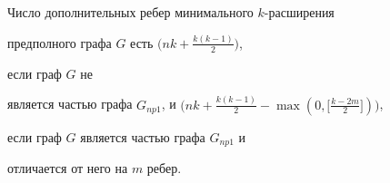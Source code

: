 \begin{cornonum}


Число дополнительных ребер минимального $k$-расширения


предполного графа $G$ есть $\big(nk + \frac{k(k-1)}{2}\big)$,


если граф $G$ не


является частью графа $G_{np1}$, и $\big(nk+\frac{k(k-1)}{2}-\max(0, \big[


\frac{k - 2m}{2} \big])\big)$,


если граф $G$ является частью графа $G_{np1}$ и


отличается от него на $m$ ребер.


\end{cornonum}





